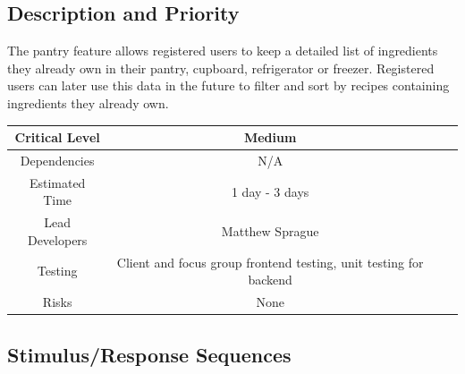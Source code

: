 \documentclass{scrreprt}
\begin{document}
\subsection{Description and Priority}

The pantry feature allows registered users to keep a detailed list of ingredients they already own in their pantry, cupboard, refrigerator or freezer. Registered users can later use this data in the future to filter and sort by recipes containing ingredients they already own.

\begin{center}
    \begin{tabular}{| c | c | c | c |}
        \hline
        Critical Level  & Medium                                                            \\
        \hline
        Dependencies    & N/A                                                               \\
        \hline
        Estimated Time  & 1 day - 3 days                                                    \\
        \hline
        Lead Developers & Matthew Sprague                                 \\
        \hline
        Testing         & Client and focus group \gls{frontend} testing,
                          \gls{unit testing} for \gls{backend}                              \\
        \hline
        Risks           & None                                                              \\
        \hline
    \end{tabular}
\end{center}

\subsection{Stimulus/Response Sequences}
\end{document}
